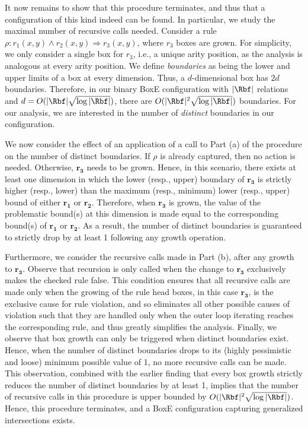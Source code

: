 \documentclass{article}
\begin{document}
It now remains to show that this procedure terminates, and thus that a configuration of this kind indeed can be found. In particular, we study the maximal number of recursive calls needed. Consider a rule $\rho: r_1(x,y) \land r_2(x,y) \Rightarrow r_3(x,y)$, where $r_3$ boxes are grown. For simplicity, we only consider a single box  for $r_3$, i.e., a unique arity position, as the analysis is analogous at every arity position. We define \emph{boundaries} as being the lower and upper limits of a box at every dimension. Thus, a $d$-dimensional box has $2d$ boundaries. Therefore, in our binary BoxE configuration with $|\Rbf|$ relations and $d=O(|\Rbf|\sqrt{\log{|\Rbf|}})$, there are $O(|\Rbf|^2\sqrt{\log{|\Rbf|}})$ boundaries. For our analysis, we are interested in the number of \emph{distinct} boundaries in our configuration. 

We now consider the effect of an application of a call to Part (a) of the procedure on the number of distinct boundaries. If $\rho$ is already captured, then no action is needed. Otherwise, $\bm{r_3}$ needs to be grown. Hence, in this scenario, there exists at least one dimension in which the lower (resp., upper) boundary of $\bm{r_3}$ is strictly higher (resp., lower) than the maximum (resp., minimum) lower (resp., upper) bound of either $\bm{r_1}$ or $\bm{r_2}$. Therefore, when $\bm{r_3}$ is grown, the value of the problematic bound(s) at this dimension is made equal to the corresponding bound(s) of $\bm{r_1}$ or $\bm{r_2}$. As a result, the number of distinct boundaries is guaranteed to strictly drop by at least 1 following any growth operation. 

Furthermore, we consider the recursive calls made in Part (b), after any growth to $\bm{r_3}$. Observe that recursion is only called when the change to $\bm{r_3}$ exclusively makes the checked rule false. This condition ensures that all recursive calls are made only when the growing of the rule head boxes, in this case $\bm{r_3}$, is the exclusive cause for rule violation, and so eliminates all other possible causes of violation such that they are handled only when the outer loop iterating reaches the corresponding rule, and thus greatly simplifies the analysis. Finally, we observe that box growth can only be triggered when distinct boundaries exist. Hence, when the number of distinct boundaries drops to its (highly pessimistic and loose) minimum possible value of 1, no more recursive calls can be made. This observation, combined with the earlier finding that every box growth strictly reduces the number of distinct boundaries by at least 1, implies that the number of recursive calls in this procedure is upper bounded by $O(|\Rbf|^2\sqrt{\log{|\Rbf|}})$. Hence, this procedure terminates, and a BoxE configuration capturing generalized intersections exists. 
\end{document}
